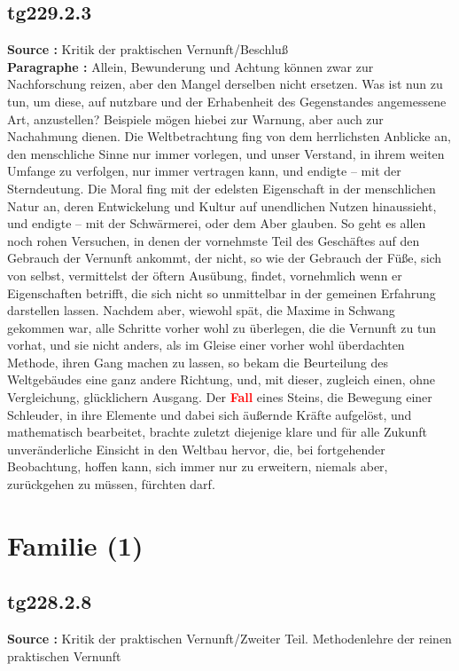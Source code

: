 \documentclass[a4paper,12pt,twoside]{book}
\newcommand{\match}[1]{\textcolor{red}{\textbf{#1}}}
\newcommand{\unnumberedsection}[1]{
	\section*{#1}
	\addcontentsline{toc}{section}{#1}
	\markright{#1}
}
\begin{document}
	\subsection*{tg229.2.3} 
	\textbf{Source : }Kritik der praktischen Vernunft/Beschluß\\  
	
	\noindent\textbf{Paragraphe : }Allein, Bewunderung und Achtung können zwar zur Nachforschung reizen, aber den Mangel derselben nicht ersetzen.  Was ist nun zu tun, um diese, auf nutzbare und der Erhabenheit des Gegenstandes angemessene Art, anzustellen? Beispiele mögen hiebei zur Warnung, aber auch zur Nachahmung dienen. Die Weltbetrachtung fing von dem herrlichsten Anblicke an, den menschliche Sinne nur immer vorlegen, und unser Verstand, in ihrem weiten Umfange zu verfolgen, nur immer vertragen kann, und endigte – mit der Sterndeutung. Die Moral fing mit der edelsten Eigenschaft in der menschlichen Natur an, deren Entwickelung und Kultur auf unendlichen Nutzen hinaussieht, und endigte – mit der Schwärmerei, oder dem Aber glauben. So geht es allen noch rohen Versuchen, in denen der vornehmste Teil des Geschäftes auf den Gebrauch der Vernunft ankommt, der nicht, so wie der Gebrauch der Füße, sich von selbst, vermittelst der öftern Ausübung, findet, vornehmlich wenn er Eigenschaften betrifft, die sich nicht so unmittelbar in der gemeinen Erfahrung darstellen lassen. Nachdem aber, wiewohl spät, die Maxime in Schwang gekommen war, alle Schritte vorher wohl zu überlegen, die die Vernunft zu tun vorhat, und sie nicht anders, als im Gleise einer vorher wohl überdachten Methode, ihren Gang machen zu lassen, so bekam die Beurteilung des Weltgebäudes eine ganz andere Richtung, und, mit dieser, zugleich einen, ohne Vergleichung, glücklichern Ausgang. Der \match{Fall} eines Steins, die Bewegung einer Schleuder, in ihre Elemente und dabei sich äußernde Kräfte aufgelöst, und mathematisch bearbeitet, brachte zuletzt diejenige klare und für alle Zukunft unveränderliche Einsicht in den Weltbau hervor, die, bei fortgehender Beobachtung, hoffen kann, sich immer nur zu erweitern, niemals aber, zurückgehen zu müssen, fürchten darf. 
	
	\unnumberedsection{Familie (1)} 
	\subsection*{tg228.2.8} 
	\textbf{Source : }Kritik der praktischen Vernunft/Zweiter Teil. Methodenlehre der reinen praktischen Vernunft\\  
	
\end{document}
